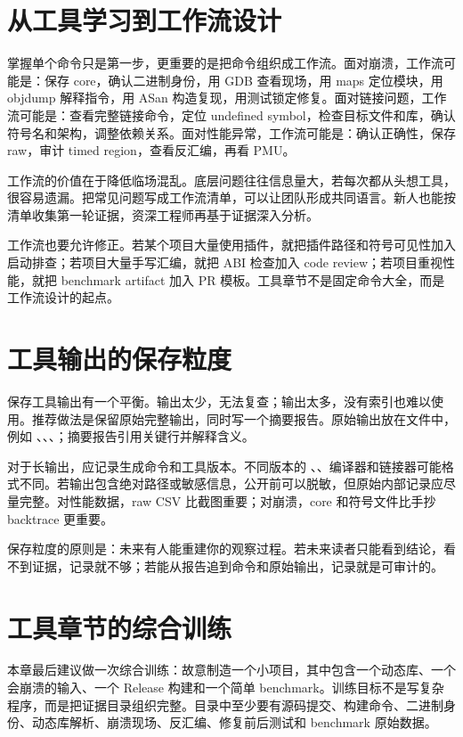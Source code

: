 \section{从工具学习到工作流设计}

掌握单个命令只是第一步，更重要的是把命令组织成工作流。面对崩溃，工作流可能是：保存 core，确认二进制身份，用 GDB 查看现场，用 maps 定位模块，用 objdump 解释指令，用 ASan 构造复现，用测试锁定修复。面对链接问题，工作流可能是：查看完整链接命令，定位 undefined symbol，检查目标文件和库，确认符号名和架构，调整依赖关系。面对性能异常，工作流可能是：确认正确性，保存 raw，审计 timed region，查看反汇编，再看 PMU。

工作流的价值在于降低临场混乱。底层问题往往信息量大，若每次都从头想工具，很容易遗漏。把常见问题写成工作流清单，可以让团队形成共同语言。新人也能按清单收集第一轮证据，资深工程师再基于证据深入分析。

工作流也要允许修正。若某个项目大量使用插件，就把插件路径和符号可见性加入启动排查；若项目大量手写汇编，就把 ABI 检查加入 code review；若项目重视性能，就把 benchmark artifact 加入 PR 模板。工具章节不是固定命令大全，而是工作流设计的起点。

\section{工具输出的保存粒度}

保存工具输出有一个平衡。输出太少，无法复查；输出太多，没有索引也难以使用。推荐做法是保留原始完整输出，同时写一个摘要报告。原始输出放在文件中，例如 、、、；摘要报告引用关键行并解释含义。

对于长输出，应记录生成命令和工具版本。不同版本的 、、编译器和链接器可能格式不同。若输出包含绝对路径或敏感信息，公开前可以脱敏，但原始内部记录应尽量完整。对性能数据，raw CSV 比截图重要；对崩溃，core 和符号文件比手抄 backtrace 更重要。

保存粒度的原则是：未来有人能重建你的观察过程。若未来读者只能看到结论，看不到证据，记录就不够；若能从报告追到命令和原始输出，记录就是可审计的。

\section{工具章节的综合训练}

本章最后建议做一次综合训练：故意制造一个小项目，其中包含一个动态库、一个会崩溃的输入、一个 Release 构建和一个简单 benchmark。训练目标不是写复杂程序，而是把证据目录组织完整。目录中至少要有源码提交、构建命令、二进制身份、动态库解析、崩溃现场、反汇编、修复前后测试和 benchmark 原始数据。

